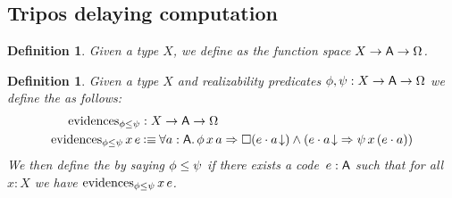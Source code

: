 \documentclass[11pt]{article}
\newtheorem{defn}[thrm]{Definition}
\begin{document}
\subsection{Tripos delaying computation}

\begin{defn}\label{defn:tripos-predicates}
  Given a type \(X\), we define  as the function space \({{X}\to{{{\ensuremath{\mathsf{A}}}\to{\Omega}}}}\).
\end{defn}

\begin{defn}\label{defn:tripos-ordering}
  Given a type \(X\) and realizability predicates \(\phi,\psi : {{X}\to{{{\ensuremath{\mathsf{A}}}\to{\Omega}}}}\)
  we define the  as
  follows:
  \begin{align*}
    \IEvidence{\phi}{\psi}
    &: \IRealPred{X}
    \\
    {\IEvidence{\phi}{\psi}\,x\,e}
    &\IsDefined
      \IForall%
      {a:\A}%
      {\IImplies%
      {\phi\,x\,a}%
      {\IAnd%
      {\IBox{(\ITotal{\IAp{e}{a}})}}%
      {(\IImplies{\ITotal{\IAp{e}{a}}}{\psi\,x\,(\IAp{e}{a})})}}}
  \end{align*}
  We then define the  by saying \({\phi}\leq{\psi}\) if there exists a
  code~\(e : \mathsf{A}\) such that for all \(x : X\) we have
  \(\text{evidences}_{{\phi}\leq{\psi}}\,x\,e\).
\end{defn}
\end{document}
